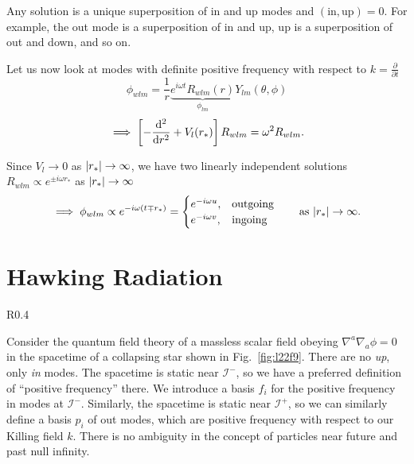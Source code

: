 Any solution is a unique superposition of in and up modes and $(\text{in}, \text{up}) = 0$.
For example, the out mode is a superposition of in and up, up is a superposition of out and down, and so on.

Let us now look at modes with definite positive frequency with respect to $k = \frac{\partial }{\partial t}$
\begin{equation}
  \phi_{wlm} = \frac{1}{r} \underbrace{e^{i \omega t} R_{w l m} (r)}_{\phi_{lm}} Y_{lm} (\theta, \phi)
\end{equation}
\begin{equation}
  \implies \left[ - \dv[2]{r} + V_l(r_*)\right] R_{w l m} = \omega^2 R_{w l m}.
\end{equation}

Since $V_l \to 0$ as $\abs{r_*} \to \infty$, we have two linearly independent solutions $R_{wlm} \propto e^{ \pm i \omega r_*}$ as $\abs{r_*} \to \infty$
\begin{equation}
  \implies \phi_{wlm} \propto e^{-i \omega (t \mp r_*)} = 
  \begin{cases}
    e^{-i \omega u}, & \text{outgoing} \\
    e^{-i \omega v}, & \text{ingoing}
  \end{cases}
  \qquad \text{as } \abs{r_*} \to \infty.
\end{equation}

\section{Hawking Radiation}%
\label{sec:hawking_radiation}

\begin{wrapfigure}{R}{0.4\columnwidth}
  \centering
  \caption{}
  \label{fig:l22f9}
\end{wrapfigure}
Consider the quantum field theory of a massless scalar field obeying $\nabla^{a} \nabla_{a} \phi =0$ in the spacetime of a collapsing star shown in Fig.~\ref{fig:l22f9}.
There are no \emph{up}, only \emph{in} modes.
The spacetime is static near $\mathscr{I}^-$, so we have a preferred definition of ``positive frequency'' there.
We introduce a basis $f_i$ for the positive frequency in modes at $\mathscr{I}^-$.
Similarly, the spacetime is static near $\mathscr{I}^+$, so we can similarly define a basis $p_i$ of out modes, which are positive frequency with respect to our Killing field $k$.
There is no ambiguity in the concept of particles near future and past null infinity.

